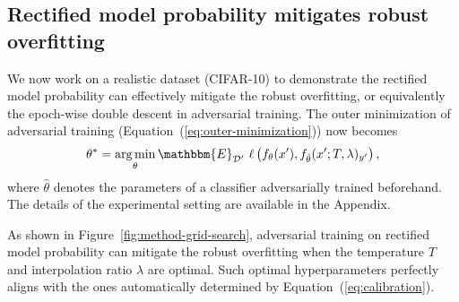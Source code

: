 \subsection{Rectified model probability mitigates robust overfitting}
\label{sect:exp-practical-adversarial-training}








We now work on a realistic dataset (CIFAR-10) to demonstrate the rectified model probability 
can effectively mitigate the robust overfitting, or equivalently the epoch-wise double descent in adversarial training. The outer minimization of adversarial training (Equation~(\ref{eq:outer-minimization})) now becomes 
    \begin{equation}
        \theta^* = \argmin_\theta \mathbbm{E}_\mathcal{D'}~ \ell\left(f_\theta(x'), f_{\hat{\theta}}(x'; T, \lambda)_{y'}\right),
    \end{equation}
    where $\hat{\theta}$ denotes the parameters of a classifier adversarially trained beforehand.
    The details of the experimental setting are available in the Appendix. 


As shown in Figure~\ref{fig:method-grid-search}, adversarial training on rectified model probability can mitigate the robust overfitting when the temperature $T$ and interpolation ratio $\lambda$ are optimal. Such optimal hyperparameters perfectly aligns with the ones automatically determined by Equation~(\ref{eq:calibration}).






